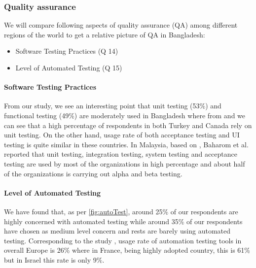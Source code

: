 \subsubsection{Quality assurance}
\label{quality_assurance_comparison}

We will compare following aspects of quality assurance (QA) among different regions of the world to get a relative picture of QA in Bangladesh:

\begin{itemize}
    \item Software Testing Practices (Q 14)
    \item Level of Automated Testing (Q 15)
\end{itemize}


\paragraph{Software Testing Practices}
From our study, we see an interesting point that unit testing (53\%) and functional testing (49\%) are moderately used in Bangladesh where from \cite{Wang2018} and \cite{Garousi2013} we can see that a high percentage of respondents in both Turkey and Canada rely on unit testing. On the other hand, usage rate of both acceptance testing and UI testing is quite similar in these countries. In Malaysia, based on \cite{Baharom2006}, Baharom et al. reported that unit testing, integration testing, system testing and acceptance testing are used by most of the organizations in high percentage and about half of the organizations is carrying out alpha and beta testing.



\paragraph{Level of Automated Testing}
We have found that, as per \ref{fig:autoTest}, around 25\% of our respondents are highly concerned with automated testing while around 35\% of our respondents have chosen as medium level concern and rests are barely using automated testing. Corresponding to the study \cite{dutta1999}, usage rate of automation testing tools in overall Europe is 26\% where in France, being highly adopted country, this is 61\% but in Israel this rate is only 9\%.
